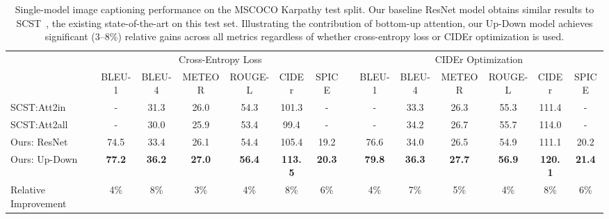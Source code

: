 \documentclass[10pt,twocolumn,letterpaper]{article}
\begin{document}
\begin{table*}
	\begin{center}\small
		\setlength{\tabcolsep}{.16em}
		\begin{tabular}{lccccccccccccc}
			\midrule
			& \multicolumn{6}{c}{Cross-Entropy Loss}     &                                                    & \multicolumn{6}{c}{CIDEr Optimization}                                                       \\
			\cmidrule{2-7}
			\cmidrule{9-14}
			& BLEU-1        & BLEU-4        & METEOR        & ROUGE-L       & CIDEr          & SPICE   &  \:\:    & BLEU-1        & BLEU-4        & METEOR        & ROUGE-L       & CIDEr          & SPICE         \\
			\midrule
			SCST:Att2in~\cite{scst2016}                &  -             & 31.3          & 26.0            & 54.3          & 101.3          &  -             &&   -          & 33.3          & 26.3          & 55.3          & 111.4          &  -             \\
			SCST:Att2all~\cite{scst2016}                &  -             & 30.0          & 25.9            & 53.4          & 99.4          &  -             &&   -          & 34.2          & 26.7          & 55.7          & 114.0          &  -             \\
			\midrule
			Ours: ResNet        & 74.5          & 33.4          & 26.1          & 54.4          & 105.4          & 19.2          && 76.6          & 34.0          & 26.5          & 54.9          & 111.1          & 20.2          \\
			Ours: Up-Down           & \textbf{77.2} & \textbf{36.2} & \textbf{27.0} & \textbf{56.4} & \textbf{113.5} & \textbf{20.3} && \textbf{79.8} & \textbf{36.3} & \textbf{27.7} & \textbf{56.9} & \textbf{120.1} & \textbf{21.4} \\
			Relative Improvement      & 4\%       & 8\%          & 3\%          & 4\%          & 8\%          & 6\%        & & 4\%       & 7\%          & 5\%          & 4\%          & 8\%          & 6\%   \\
			\midrule
		\end{tabular}
	\end{center}
	\caption{Single-model image captioning performance on the MSCOCO Karpathy test split. Our baseline ResNet model obtains similar results to SCST~\cite{scst2016}, the existing state-of-the-art on this test set. Illustrating the contribution of bottom-up attention, our Up-Down model achieves significant (3--8\%) relative gains across all metrics regardless of whether cross-entropy loss or CIDEr optimization is used. }
	\label{tab:karpathy}
\end{table*}
\end{document}
